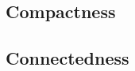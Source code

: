 \documentclass{article}
\begin{document}
\subsection{Compactness}
\subsection{Connectedness}








\end{document}
